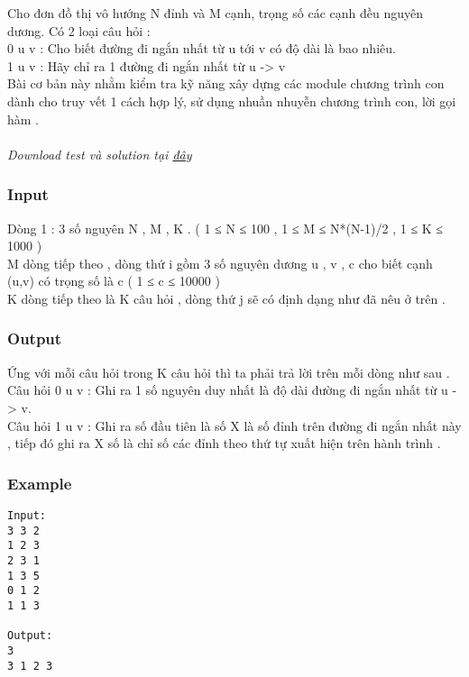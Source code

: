



   Cho đơn đồ thị vô hướng N đỉnh và M cạnh, trọng số các cạnh đều nguyên dương. Có 2 loại câu hỏi :   
\\   0 u v : Cho biết đường đi ngắn nhất từ u tới v có độ dài là bao nhiêu.   
\\   1 u v : Hãy chỉ ra 1 đường đi ngắn nhất từ u -> v   
\\   Bài cơ bản này nhằm kiểm tra kỹ năng xây dựng các module chương trình con dành cho truy vết 1 cách hợp lý, sử dụng nhuần nhuyễn chương trình con, lời gọi hàm .   
\\
\\\textit{    Download test và solution tại    \href{http://vn.spoj.pl/content/floyd.rar}{     đây    }}

\subsubsection{   Input  }

   Dòng 1 : 3 số nguyên N , M , K . ( 1 ≤ N ≤ 100 , 1 ≤ M ≤ N*(N-1)/2  , 1 ≤ K ≤ 1000 )   
\\   M dòng tiếp theo , dòng thứ i gồm 3 số nguyên dương u , v , c cho biết cạnh (u,v) có trọng số là c ( 1 ≤ c ≤ 10000 )   
\\   K dòng tiếp theo là K câu hỏi , dòng thứ j sẽ có định dạng như đã nêu ở trên .   
\\

\subsubsection{   Output  }

   Ứng với mỗi câu hỏi trong K câu hỏi thì ta phải trả lời trên mỗi dòng như sau .   
\\   Câu hỏi 0 u v : Ghi ra 1 số nguyên duy nhất là độ dài đường đi ngắn nhất từ u -> v.   
\\   Câu hỏi 1 u v : Ghi ra số đầu tiên là số X là số đỉnh trên đường đi ngắn nhất này , tiếp đó ghi ra X số là chỉ số các đỉnh theo thứ tự xuất hiện trên hành trình .   
\\

\subsubsection{   Example  }
\begin{verbatim}
Input:
3 3 2
1 2 3
2 3 1
1 3 5
0 1 2
1 1 3

Output:
3
3 1 2 3
\end{verbatim}
